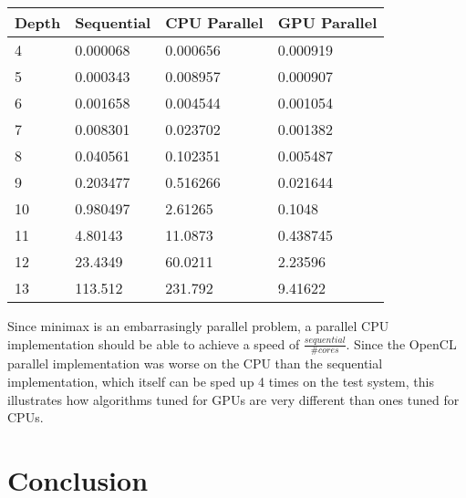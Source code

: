 \documentclass{article}
\begin{document}
\begin{tabular}{| l | l | l | l |}
  \hline
  Depth & Sequential & CPU Parallel & GPU Parallel \\
  \hline
  4 & 0.000068 & 0.000656 & 0.000919 \\
  5 & 0.000343 & 0.008957 & 0.000907 \\
  6 & 0.001658 & 0.004544 & 0.001054 \\
  7 & 0.008301 & 0.023702 & 0.001382 \\
  8 & 0.040561 & 0.102351 & 0.005487 \\
  9 & 0.203477 & 0.516266 & 0.021644 \\
  10 & 0.980497 & 2.61265 & 0.1048 \\
  11 & 4.80143 & 11.0873 & 0.438745 \\
  12 & 23.4349 & 60.0211 & 2.23596 \\
  13 & 113.512 & 231.792 & 9.41622 \\
  \hline
\end{tabular}
Since minimax is an embarrasingly parallel problem, a parallel CPU implementation should be able to achieve a speed of $\frac{sequential}{\# cores}$. Since the OpenCL parallel implementation was worse on the CPU than the sequential implementation, which itself can be sped up 4 times on the test system, this illustrates how algorithms tuned for GPUs are very different than ones tuned for CPUs.

\section{Conclusion}
\end{document}
